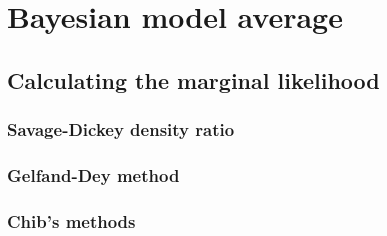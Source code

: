 \chapter{Bayesian model average}\label{chap10}

\section{Calculating the marginal likelihood}\label{sec10_1}

\subsection{Savage-Dickey density ratio}\label{sec10_11}

\subsection{Gelfand-Dey method}\label{sec10_12}

\subsection{Chib's methods}\label{sec10_13}